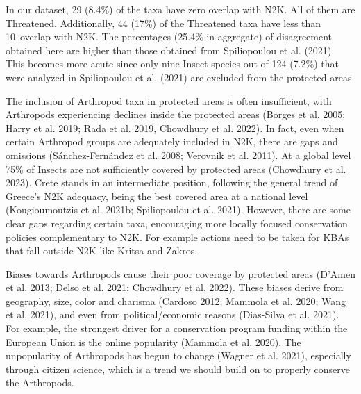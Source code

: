 In our dataset, 29 (8.4\%) of the taxa have zero overlap with N2K. All of them
are Threatened. Additionally, 44 (17\%) of the Threatened taxa have less than
10\ overlap with N2K. The percentages (25.4\% in aggregate) of disagreement
obtained here are higher than those obtained from Spiliopoulou et al. (2021).
This becomes more acute since only nine Insect species out of 124 (7.2\%) that
were analyzed in Spiliopoulou et al. (2021) are excluded from the protected areas.

The inclusion of Arthropod taxa in protected areas is often insufficient, with
Arthropods experiencing declines inside the protected areas (Borges et al. 2005; Harry et al. 2019; Rada et al. 2019, Chowdhury et al. 2022).
In fact, even when certain Arthropod groups are adequately included in N2K,
there are gaps and omissions (Sánchez-Fernández et al. 2008; Verovnik et al. 2011).
At a global level 75\% of Insects are not sufficiently covered by protected
areas (Chowdhury et al. 2023). Crete stands in an intermediate position,
following the general trend of Greece’s N2K adequacy, being the best covered
area at a national level (Kougioumoutzis et al. 2021b; Spiliopoulou et al. 2021).
However, there are some clear gaps regarding certain taxa, encouraging more
locally focused conservation policies complementary to N2K. For example actions
need to be taken for KBAs that fall outside N2K like Kritsa and Zakros.

Biases towards Arthropods cause their poor coverage by protected
areas (D’Amen et al. 2013; Delso et al. 2021; Chowdhury et al. 2022). These
biases derive from geography, size, color and charisma (Cardoso 2012; Mammola et al. 2020; Wang et al. 2021),
and even from political/economic reasons (Dias-Silva et al. 2021). For example,
the strongest driver for a conservation program funding within the European
Union is the online popularity (Mammola et al. 2020). The unpopularity of
Arthropods has begun to change (Wagner et al. 2021), especially through citizen
science, which is a trend we should build on to properly conserve the Arthropods.

